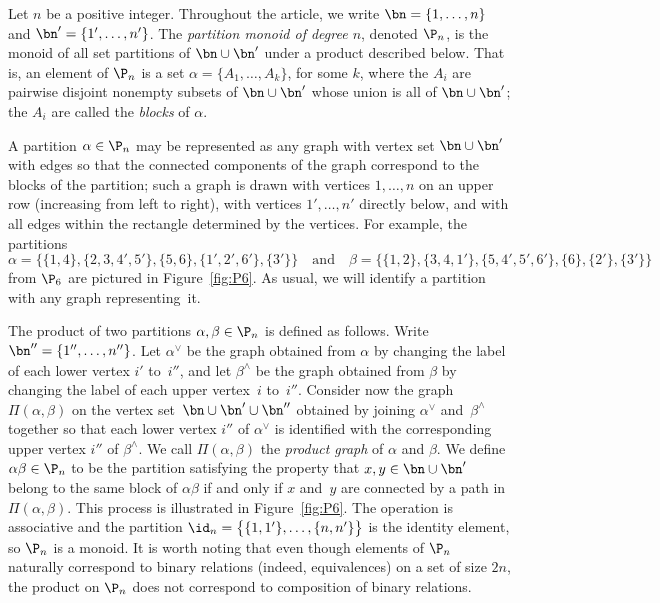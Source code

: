Let $n$ be a positive integer.  Throughout the article, we write
$\bn=\{1,\ldots,n\}$ and $\bn'=\{1',\ldots,n'\}$.  The \emph{partition monoid
of degree $n$}, denoted $\P_n$, is the monoid of all set partitions of
$\bn\cup\bn'$ under a product described below.  That is, an element of $\P_n$
is a set $\alpha=\{A_1,\ldots,A_k\}$, for some $k$, where the $A_i$ are pairwise
disjoint nonempty subsets of $\bn\cup\bn'$ whose union is all of $\bn\cup\bn'$;
the $A_i$ are called the \emph{blocks} of $\alpha$.  

A partition $\alpha\in\P_n$ may be represented as any graph with vertex set
$\bn\cup\bn'$ with edges so that the connected components of the
graph correspond to the blocks of the partition; such a graph is drawn with
vertices $1,\ldots,n$ on an upper row (increasing from left to right), with
vertices $1',\ldots,n'$ directly below, and with all edges within the rectangle
determined by the vertices.   For example, the partitions
\[
\alpha = \big\{ \{1,4\},\{2,3,4',5'\},\{5,6\},\{1',2',6'\},\{3'\}\big\} \quad\text{and}\quad
\beta = \big\{ \{1,2\}, \{3,4,1'\}, \{5,4',5',6'\}, \{6\}, \{2'\}, \{3'\} \big\}
\]
from $\P_6$ are pictured in Figure~\ref{fig:P6}.  As usual, we will identify a
partition with any graph representing~it.

The product of two partitions $\alpha,\beta\in\P_n$ is defined as follows.  Write
$\bn''=\{1'',\ldots,n''\}$.  Let $\alpha^\vee$ be the graph obtained from $\alpha$ by
changing the label of each lower vertex $i'$ to~$i''$, and let $\beta^\wedge$ be
the graph obtained from $\beta$ by changing the label of each upper vertex~$i$
to~$i''$.  Consider now the graph $\Pi(\alpha,\beta)$ on the vertex set~$\bn\cup
\bn'\cup \bn''$ obtained by joining $\alpha^\vee$ and~$\beta^\wedge$ together so
that each lower vertex $i''$ of $\alpha^\vee$ is identified with the corresponding
upper vertex $i''$ of $\beta^\wedge$.  We call $\Pi(\alpha,\beta)$ the \emph{product
graph} of $\alpha$ and $\beta$.  We define $\alpha\beta\in\P_n$ to be the partition
satisfying the property that $x,y\in\bn\cup\bn'$ belong to the same block of
$\alpha\beta$ if and only if $x$ and~$y$ are connected by a path in $\Pi(\alpha,\beta)$.
This process is illustrated in Figure~\ref{fig:P6}.  
%
The operation is associative and the partition
$\id_n=\big\{\{1,1'\},\ldots,\{n,n'\}\big\}$ is the identity element, so $\P_n$ is
a monoid. 
%
It is worth noting that even though elements of $\P_n$ naturally correspond to binary relations (indeed, equivalences) on a set of size $2n$, the product on $\P_n$ does not correspond to composition of binary relations.

